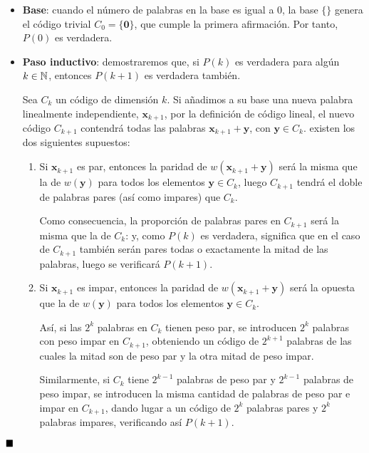 \begin{itemize}
	\item \textbf{Base}: cuando el número de palabras en la base es igual a $0$, la base $\{\}$ genera el código trivial $C_0 = \{\textbf{0}\}$, que cumple la primera afirmación. Por tanto, $P(0)$ es verdadera.
	\item \textbf{Paso inductivo}: demostraremos que, si $P(k)$ es verdadera para algún $k\in\mathbb{N}$, entonces $P(k+1)$ es verdadera también.
	
	Sea $C_k$ un código de dimensión $k$. Si añadimos a su base una nueva palabra linealmente independiente, $\textbf{x}_{k+1}$, por la definición de código lineal, el nuevo código $C_{k+1}$ contendrá todas las palabras $\textbf{x}_{k+1} + \textbf{y}$, con $\textbf{y} \in C_k$. existen los dos siguientes supuestos:
	
	\begin{enumerate}
		\item Si $\textbf{x}_{k+1}$ es par, entonces la paridad de $w(\textbf{x}_{k+1} + \textbf{y})$ será la misma que la de $w(\textbf{y})$ para todos los elementos $\textbf{y} \in C_k$, luego $C_{k+1}$ tendrá el doble de palabras pares (así como impares) que $C_k$.
		
		Como consecuencia, la proporción de palabras pares en $C_{k+1}$ será la misma que la de $C_k$: y, como $P(k)$ es verdadera, significa que en el caso de $C_{k+1}$ también serán pares todas o exactamente la mitad de las palabras, luego se verificará $P(k+1)$.
		
		\item Si $\textbf{x}_{k+1}$ es impar, entonces la paridad de $w(\textbf{x}_{k+1} + \textbf{y})$ será la opuesta que la de $w(\textbf{y})$ para todos los elementos $\textbf{y} \in C_k$.
		
		Así, si las $2^k$ palabras en $C_k$ tienen peso par, se introducen $2^k$ palabras con peso impar en $C_{k+1}$, obteniendo un código de $2^{k+1}$ palabras de las cuales la mitad son de peso par y la otra mitad de peso impar.
		
		Similarmente, si $C_k$ tiene $2^{k-1}$ palabras de peso par y $2^{k-1}$ palabras de peso impar, se introducen la misma cantidad de palabras de peso par e impar en $C_{k+1}$, dando lugar a un código de $2^k$ palabras pares y $2^k$ palabras impares, verificando así $P(k+1)$.
	\end{enumerate}
\end{itemize}

$\qed$

